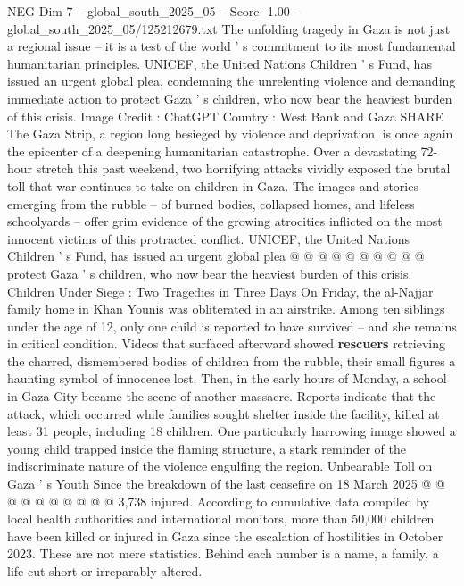\begin{textsample}{NEG Dim 7 – global\_south\_2025\_05 – Score -1.00 – global\_south\_2025\_05/125212679.txt}  \label{ex:f7_neg_015}
The unfolding tragedy in Gaza is not just a regional issue -- it is a test of the world ' s commitment to its most fundamental humanitarian principles.
UNICEF, the United Nations Children ' s Fund, has issued an urgent global plea, condemning the unrelenting violence and demanding immediate action to protect Gaza ' s children, who now bear the heaviest burden of this crisis.
Image Credit : ChatGPT Country : West Bank and Gaza SHARE The Gaza Strip, a region long besieged by violence and deprivation, is once again the epicenter of a deepening humanitarian catastrophe.
Over a devastating 72-hour stretch this past weekend, two horrifying attacks vividly exposed the brutal toll that war continues to take on children in Gaza.
The images and stories emerging from the rubble -- of burned bodies, collapsed homes, and lifeless schoolyards -- offer grim evidence of the growing atrocities inflicted on the most innocent victims of this protracted conflict.
UNICEF, the United Nations Children ' s Fund, has issued an urgent global plea @ @ @ @ @ @ @ @ @ @ protect Gaza ' s children, who now bear the heaviest burden of this crisis.
Children Under Siege : Two Tragedies in Three Days On Friday, the al-Najjar family home in Khan Younis was obliterated in an airstrike.
Among ten siblings under the age of 12, only one child is reported to have survived -- and she remains in critical condition.
Videos that surfaced afterward showed \textbf{rescuers} retrieving the charred, dismembered bodies of children from the rubble, their small figures a haunting symbol of innocence lost.
Then, in the early hours of Monday, a school in Gaza City became the scene of another massacre.
Reports indicate that the attack, which occurred while families sought shelter inside the facility, killed at least 31 people, including 18 children.
One particularly harrowing image showed a young child trapped inside the flaming structure, a stark reminder of the indiscriminate nature of the violence engulfing the region.
Unbearable Toll on Gaza ' s Youth Since the breakdown of the last ceasefire on 18 March 2025 @ @ @ @ @ @ @ @ @ @ 3,738 injured.
According to cumulative data compiled by local health authorities and international monitors, more than 50,000 children have been killed or injured in Gaza since the escalation of hostilities in October 2023.
These are not mere statistics.
Behind each number is a name, a family, a life cut short or irreparably altered.

\end{textsample}
